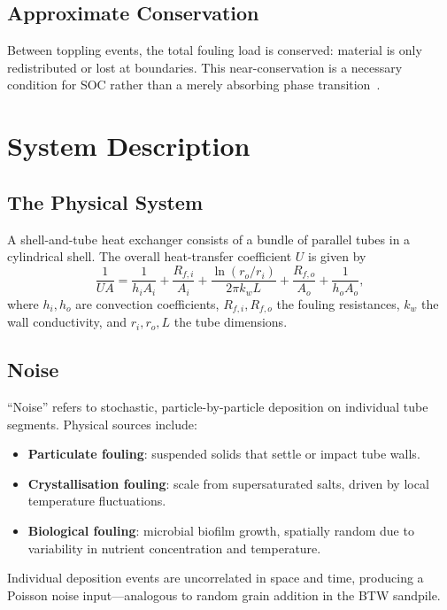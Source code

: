 \documentclass[10pt,a4paper,twocolumn]{article}
\begin{document}
\subsection{Approximate Conservation}

Between toppling events, the total fouling load is conserved: material is
only redistributed or lost at boundaries. This near-conservation is a
necessary condition for SOC rather than a merely absorbing phase
transition~\cite{dickman2000}.

\section{System Description}
\label{sec:description}

\subsection{The Physical System}

A shell-and-tube heat exchanger consists of a bundle of parallel tubes in a
cylindrical shell. The overall heat-transfer coefficient $U$ is given by
\begin{equation}
  \frac{1}{U A} = \frac{1}{h_i A_i} + \frac{R_{f,i}}{A_i}
                + \frac{\ln(r_o/r_i)}{2\pi k_w L}
                + \frac{R_{f,o}}{A_o} + \frac{1}{h_o A_o},
  \label{eq:overall_U}
\end{equation}
where $h_i, h_o$ are convection coefficients, $R_{f,i}, R_{f,o}$ the
fouling resistances, $k_w$ the wall conductivity, and $r_i, r_o, L$ the tube
dimensions.

\subsection{Noise}

``Noise'' refers to stochastic, particle-by-particle deposition on individual
tube segments. Physical sources include:
\begin{itemize}
  \item \textbf{Particulate fouling}: suspended solids that settle or impact
        tube walls.
  \item \textbf{Crystallisation fouling}: scale from supersaturated salts,
        driven by local temperature fluctuations.
  \item \textbf{Biological fouling}: microbial biofilm growth, spatially
        random due to variability in nutrient concentration and temperature.
\end{itemize}
Individual deposition events are uncorrelated in space and time, producing a
Poisson noise input---analogous to random grain addition in the BTW sandpile.
\end{document}
